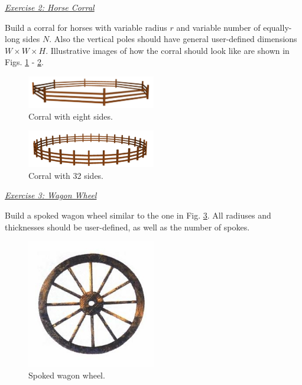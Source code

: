 \documentclass[article,A4,12pt]{llncs}
\begin{document}
\noindent
\underline{\em Exercise 2: Horse Corral}

Build a corral for horses with variable radius $r$ and variable number 
of equally-long sides $N$. Also the vertical poles should have general user-defined 
dimensions $W \times W \times H$. Illustrative images of how the corral should look like 
are shown in Figs. \ref{fig:corral2} - \ref{fig:corral3}.

\begin{figure}[!ht]
\begin{center}
\includegraphics[width=0.5\textwidth]{img/tam-3.png}
\end{center}
\vspace{-2mm}
\caption{Corral with eight sides.}
\label{fig:corral2}
\end{figure}
\noindent

\newpage

\begin{figure}[!ht]
\begin{center}
\includegraphics[width=0.5\textwidth]{img/tam-4.png}
\end{center}
\vspace{-2mm}
\caption{Corral with 32 sides.}
\label{fig:corral3}
\end{figure}
\noindent
\noindent
\underline{\em Exercise 3: Wagon Wheel}

Build a spoked wagon wheel similar to the one in Fig. \ref{fig:wheel-1}. All radiuses 
and thicknesses should be user-defined, as well as the number of spokes.

\begin{figure}[!ht]
\begin{center}
\includegraphics[width=0.5\textwidth]{img/wagonwheel-1.png}
\end{center}
\vspace{-2mm}
\caption{Spoked wagon wheel.}
\label{fig:wheel-1}
\end{figure}
\noindent
\end{document}
